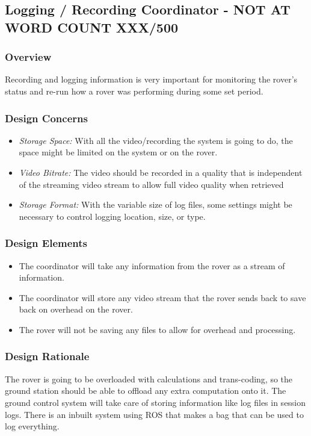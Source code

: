 \subsection{Logging / Recording Coordinator - NOT AT WORD COUNT XXX/500}
\subsubsection{Overview}
Recording and logging information is very important for monitoring the rover's status and re-run how a rover was performing during some set period.

\subsubsection{Design Concerns}
\begin{itemize}
\item \textit{Storage Space:} With all the video/recording the system is going to do, the space might be limited on the system or on the rover.
\item \textit{Video Bitrate:} The video should be recorded in a quality that is independent of the streaming video stream to allow full video quality when retrieved
\item \textit{Storage Format:} With the variable size of log files, some settings might be necessary to control logging location, size, or type. 
\end{itemize}

\subsubsection{Design Elements}
\begin{itemize}
\item The coordinator will take any information from the rover as a stream of information.
\item The coordinator will store any video stream that the rover sends back to save back on overhead on the rover.
\item The rover will not be saving any files to allow for overhead and processing.
\end{itemize}

\subsubsection{Design Rationale}
The rover is going to be overloaded with calculations and trans-coding, so the ground station should be able to offload any extra computation onto it.
The ground control system will take care of storing information like log files in session logs.
There is an inbuilt system using ROS that makes a bag that can be used to log everything.


